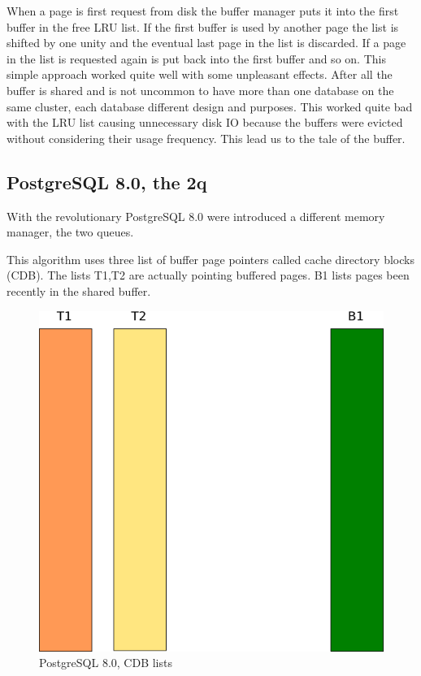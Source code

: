 When a page is first request from disk the buffer manager puts it into the first buffer in the free LRU 
list. If the first buffer is used by another page the list is shifted by one unity and the eventual last 
page in the list is discarded. If a page in the list is requested again is put back into the first buffer 
and so on. This simple approach worked quite well with some unpleasant effects. After all the buffer is 
shared and is not uncommon to have more than one database on the same cluster, each database different 
design and purposes. This worked quite bad with the LRU list causing unnecessary disk IO because the 
buffers were evicted without considering their usage frequency. This lead us to the tale of the buffer.


\subsection{PostgreSQL 8.0, the 2q}
With the revolutionary PostgreSQL 8.0 were introduced a different memory manager, the two queues.\newline 

This algorithm uses three list of buffer page pointers called cache directory blocks (CDB). The lists T1,T2 are 
actually pointing buffered pages. B1 lists pages been recently in the shared buffer. 

\begin{figure}[H]
\includegraphics[scale=0.6]{images/shared_buffer_80.png}

\caption{PostgreSQL 8.0, CDB lists}

\end{figure}

